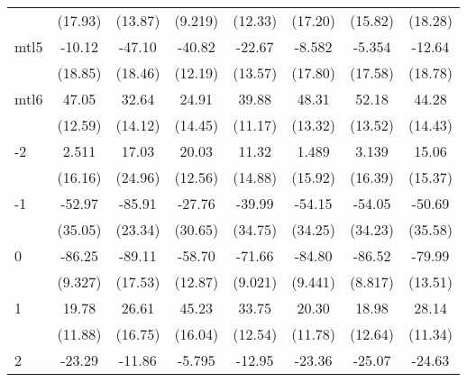 \documentclass{article}
\begin{document}
{\begin{longtable}{l*{7}{c}}
                &  (17.93)         &  (13.87)         &  (9.219)         &  (12.33)         &  (17.20)         &  (15.82)         &  (18.28)         \\
mtl5            &   -10.12         &   -47.10\sym{*}  &   -40.82\sym{**} &   -22.67         &   -8.582         &   -5.354         &   -12.64         \\
                &  (18.85)         &  (18.46)         &  (12.19)         &  (13.57)         &  (17.80)         &  (17.58)         &  (18.78)         \\
mtl6            &    47.05\sym{**} &    32.64\sym{*}  &    24.91         &    39.88\sym{**} &    48.31\sym{**} &    52.18\sym{**} &    44.28\sym{*}  \\
                &  (12.59)         &  (14.12)         &  (14.45)         &  (11.17)         &  (13.32)         &  (13.52)         &  (14.43)         \\
-2              &    2.511         &    17.03         &    20.03         &    11.32         &    1.489         &    3.139         &    15.06         \\
                &  (16.16)         &  (24.96)         &  (12.56)         &  (14.88)         &  (15.92)         &  (16.39)         &  (15.37)         \\
-1              &   -52.97         &   -85.91\sym{**} &   -27.76         &   -39.99         &   -54.15         &   -54.05         &   -50.69         \\
                &  (35.05)         &  (23.34)         &  (30.65)         &  (34.75)         &  (34.25)         &  (34.23)         &  (35.58)         \\
0               &   -86.25\sym{***}&   -89.11\sym{***}&   -58.70\sym{**} &   -71.66\sym{***}&   -84.80\sym{***}&   -86.52\sym{***}&   -79.99\sym{***}\\
                &  (9.327)         &  (17.53)         &  (12.87)         &  (9.021)         &  (9.441)         &  (8.817)         &  (13.51)         \\
1               &    19.78         &    26.61         &    45.23\sym{*}  &    33.75\sym{*}  &    20.30         &    18.98         &    28.14\sym{*}  \\
                &  (11.88)         &  (16.75)         &  (16.04)         &  (12.54)         &  (11.78)         &  (12.64)         &  (11.34)         \\
2               &   -23.29         &   -11.86         &   -5.795         &   -12.95         &   -23.36         &   -25.07         &   -24.63         \\

\end{longtable}}
\end{document}

